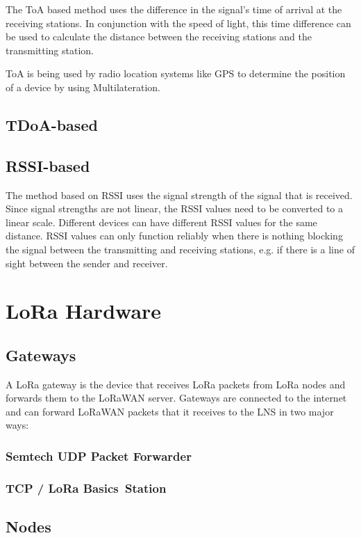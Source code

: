 The \acf{ToA} based method uses the difference in the signal's time of arrival at the receiving stations.
In conjunction with the speed of light, this time difference can be used to calculate the distance between the receiving stations and the transmitting station.

\ac{ToA} is being used by radio location systems like \ac{GPS} to determine the position of a device by using Multilateration.

\subsection{\acs{TDoA}-based}



\subsection{\acs{RSSI}-based}

The method based on \acf{RSSI} uses the signal strength of the signal that is received.
Since signal strengths are not linear, the \ac{RSSI} values need to be converted to a linear scale.
Different devices can have different \ac{RSSI} values for the same distance.
\ac{RSSI} values can only function reliably when there is nothing blocking the signal between the transmitting and receiving stations, e.g. if there is a line of sight between the sender and receiver.

\section{\ac{LoRa} Hardware}

\subsection{Gateways}

A \ac{LoRa} gateway is the device that receives \ac{LoRa} packets from \ac{LoRa} nodes and forwards them to the \ac{LoRaWAN} server.
Gateways are connected to the internet and can forward \ac{LoRaWAN} packets that it receives to the \ac{LNS} in two major ways:

\subsubsection{Semtech \acs{UDP} Packet Forwarder}


\subsubsection{\acf{TCP} / LoRa Basics\texttrademark~Station}


\subsection{Nodes}
